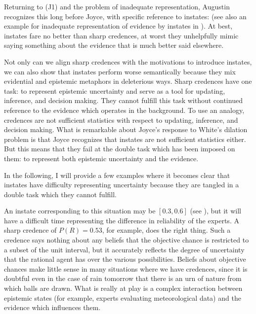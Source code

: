 \documentclass[11pt]{article}
\begin{document}
Returning to (J1) and the problem of inadequate representation, Augustin recognizes this long before Joyce, with specific reference to instates:   (see also an example for inadequate representation of evidence by instates in ). At best, instates fare no better than sharp credences, at worst they unhelpfully mimic saying something about the evidence that is much better said elsewhere.

Not only can we align sharp credences with the motivations to introduce instates, we can also show that instates perform worse semantically because they mix evidential and epistemic metaphors in deleterious ways. Sharp credences have one task: to represent epistemic uncertainty and serve as a tool for updating, inference, and decision making. They cannot fulfill this task without continued reference to the evidence which operates in the background. To use an analogy, credences are not sufficient statistics with respect to updating, inference, and decision making. What is remarkable about Joyce's response to White's dilation problem is that Joyce recognizes that instates are not sufficient statistics either. But this means that they fail at the double task which has been imposed on them: to represent both epistemic uncertainty and the evidence.

In the following, I will provide a few examples where it becomes clear that instates have difficulty representing uncertainty because they are tangled in a double task which they cannot fulfill.


An instate corresponding to this situation may be $[0.3,0.6]$ (see ), but it will have a difficult time representing the difference in reliability of the experts. A sharp credence of $P(R)=0.53$, for example, does the right thing. Such a credence says nothing about any beliefs that the objective chance is restricted to a subset of the unit interval, but it accurately reflects the degree of uncertainty that the rational agent has over the various possibilities. Beliefs about objective chances make little sense in many situations where we have credences, since it is doubtful even in the case of rain tomorrow that there is an urn of nature from which balls are drawn. What is really at play is a complex interaction between epistemic states (for example, experts evaluating meteorological data) and the evidence which influences them.
\end{document}

